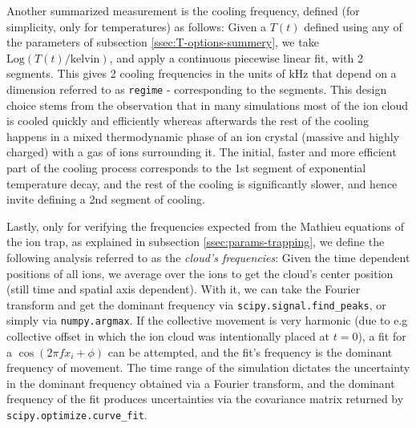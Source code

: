 Another summarized measurement is the cooling frequency, defined (for simplicity, only for temperatures) as follows: Given a $T(t)$ defined using any of the parameters of subsection \ref{ssec:T-options-summery}, we take $\mathrm{Log}(T(t)/\mathrm{kelvin})$, and apply a continuous piecewise linear fit\cite{pwlf}, with 2 segments. This gives 2 cooling frequencies in the units of $\mathrm{kHz}$ that depend on a dimension referred to as \texttt{regime} - corresponding to the segments. This design choice stems from the observation that in many simulations most of the ion cloud is cooled quickly and efficiently whereas afterwards the rest of the cooling happens in a mixed thermodynamic phase of an ion crystal (massive and highly charged) with a gas of ions surrounding it. The initial, faster and more efficient part of the cooling process corresponds to the 1st segment of exponential temperature decay, and the rest of the cooling is significantly slower, and hence invite defining a 2nd segment of cooling.

Lastly, only for verifying the frequencies expected from the Mathieu equations of the ion trap, as explained in subsection \ref{ssec:params-trapping}, we define the following analysis referred to as the \textit{cloud's frequencies}: Given the time dependent positions of all ions, we average over the ions to get the cloud's center position (still time and spatial axis dependent). With it, we can take the Fourier transform and get the dominant frequency via \texttt{scipy.signal.find\_peaks}\cite{scipy}, or simply via \texttt{numpy.argmax}\cite{numpy}. If the collective movement is very harmonic (due to e.g collective offset in which the ion cloud was intentionally placed at $t=0$), a fit for a $\cos(2\pi f x_i + \phi)$ can be attempted, and the fit's frequency is the dominant frequency of movement. The time range of the simulation dictates the uncertainty in the dominant frequency obtained via a Fourier transform, and the dominant frequency of the fit produces uncertainties via the covariance matrix returned by \texttt{scipy.optimize.curve\_fit}.
